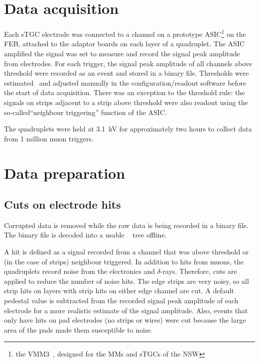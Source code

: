 \section{Data acquisition}
Each sTGC electrode was connected to a channel on a prototype ASIC\footnote{the VMM3~\cite{iakovidis_vmm3_2017}, designed for the MMs and sTGCs of the NSW} on the FEB, attached to the adaptor boards on each layer of a quadruplet.  The ASIC amplified the signal was set to measure and record the signal peak amplitude from electrodes. For each trigger, the signal peak amplitude of all channels above threshold were recorded as an event and stored in a binary file. Thresholds were estimated~\cite{chen_calibration_2019} and adjusted manually in the configuration/readout software before the start of data acquisition. There was an exception to the threshold rule: the signals on strips adjacent to a strip above threshold were also readout using the so-called``neighbour triggering'' function of the ASIC. 

The quadruplets were held at 3.1~kV for approximately two hours to collect data from 1 million muon triggers.

\section{Data preparation}
\subsection{Cuts on electrode hits}
Corrupted data is removed while the raw data is being recorded in a binary file. The binary file is decoded into a usable ~\cite{ROOT_paper} tree offline. 

A hit is defined as a signal recorded from a channel that was above threshold or (in the case of strips) neighbour triggered. In addition to hits from muons, the quadruplets record noise from the electronics and $\delta$-rays. Therefore, cuts are applied to reduce the number of noise hits. The edge strips are very noisy, so all strip hits on layers with strip hits on either edge channel are cut. A default pedestal value is subtracted from the recorded signal peak amplitude of each electrode for a more realistic estimate of the signal amplitude. Also, events that only have hits on pad electrodes (no strips or wires) were cut because the large area of the pads made them susceptible to noise.

